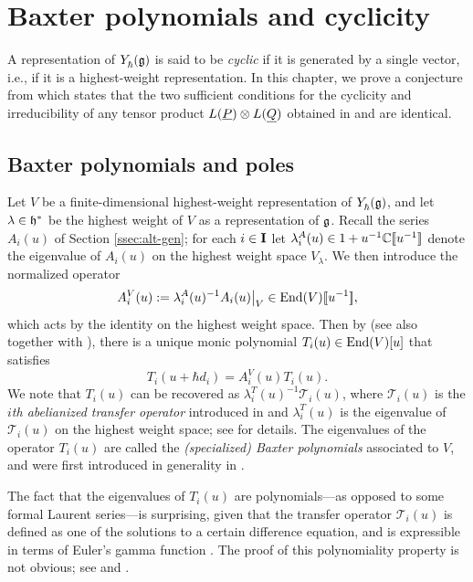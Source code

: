 \chapter{Baxter polynomials and cyclicity}\label{chap:baxter}

A representation of $Y_\hbar^{}(\mathfrak{g})$ is said to be \emph{cyclic} if it is generated by a single vector, i.e., if it is a highest-weight representation.
In this chapter, we prove a conjecture from \cite[\S 7.4]{gautam_poles_2023} which states that the two sufficient conditions for the cyclicity and irreducibility of any tensor product $L(\underline{P})\otimes L(\underline{Q})$ obtained in \cite{gautam_poles_2023} and \cite{tan_braid_2015} are identical.


\section{Baxter polynomials and poles}\label{sec:baxter-poles}

Let $V$ be a finite-dimensional highest-weight representation of $Y_\hbar^{}(\mathfrak{g})$, and let $\lambda\in\mathfrak{h}^*$ be the highest weight of $V$ as a representation of $\mathfrak{g}$.
Recall the series $A_i(u)$ of Section \ref{ssec:alt-gen}; for each $i\in\mathbf{I}$ let $\lambda_i^A(u)\in 1+u^{-1}\mathbb{C}[\![u^{-1}]\!]$ denote the eigenvalue of $A_i(u)$ on the highest weight space $V_\lambda$.
We then introduce the normalized operator
\[A_i^V(u) := \lambda_i^A(u)^{-1}A_i(u)\big|_V \in\operatorname{End}(V)[\![u^{-1}]\!],\]
which acts by the identity on the highest weight space.
Then by \cite[Thm. 4.4]{gautam_poles_2023} (see also \cite[Cor. 4.7]{gautam_poles_2023} together with \cite[Prop. 5.7, 5.8]{hernandez_shifted_2022}), there is a unique monic polynomial $T_i(u)\in\operatorname{End}(V)[u]$ that satisfies
\begin{equation}\label{eqn:transfer-op}
    T_i(u+\hbar d_i) = A_i^V(u)T_i(u).
\end{equation}
We note that $T_i(u)$ can be recovered as $\lambda_i^T(u)^{-1}\mathscr{T}_i(u)$, where $\mathscr{T}_i(u)$ is the \emph{$i$th abelianized transfer operator} introduced in \cite[\S 4.3]{gautam_poles_2023} and $\lambda_i^T(u)$ is the eigenvalue of $\mathscr{T}_i(u)$ on the highest weight space; see \cite[Remark 5.1]{friesen_braid_2024} for details.
The eigenvalues of the operator $T_i(u)$ are called the \emph{(specialized) Baxter polynomials} associated to $V$, and were first introduced in generality in \cite{frenkel_baxters_2015}.

\begin{remark}
    The fact that the eigenvalues of $T_i(u)$ are polynomials---as opposed to some formal Laurent series---is surprising, given that the transfer operator $\mathscr{T}_i(u)$ is defined as one of the solutions to a certain difference equation, and is expressible in terms of Euler's gamma function \cite[\S 4.3]{gautam_poles_2023}.
    The proof of this polynomiality property is not obvious; see \cite[Thm. 4.4]{gautam_poles_2023} and \cite[Thm. 5.9]{frenkel_baxters_2015}.
\end{remark}

